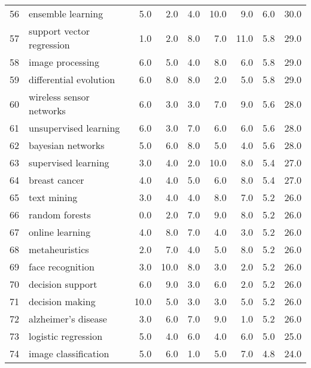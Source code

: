 \begin{tabular}{llrrrrrrr}
56 &                ensemble learning &   5.0 &   2.0 &    4.0 &   10.0 &    9.0 &    6.0 &   30.0 \\
57 &        support vector regression &   1.0 &   2.0 &    8.0 &    7.0 &   11.0 &    5.8 &   29.0 \\
58 &                 image processing &   6.0 &   5.0 &    4.0 &    8.0 &    6.0 &    5.8 &   29.0 \\
59 &           differential evolution &   6.0 &   8.0 &    8.0 &    2.0 &    5.0 &    5.8 &   29.0 \\
60 &         wireless sensor networks &   6.0 &   3.0 &    3.0 &    7.0 &    9.0 &    5.6 &   28.0 \\
61 &            unsupervised learning &   6.0 &   3.0 &    7.0 &    6.0 &    6.0 &    5.6 &   28.0 \\
62 &                bayesian networks &   5.0 &   6.0 &    8.0 &    5.0 &    4.0 &    5.6 &   28.0 \\
63 &              supervised learning &   3.0 &   4.0 &    2.0 &   10.0 &    8.0 &    5.4 &   27.0 \\
64 &                    breast cancer &   4.0 &   4.0 &    5.0 &    6.0 &    8.0 &    5.4 &   27.0 \\
65 &                      text mining &   3.0 &   4.0 &    4.0 &    8.0 &    7.0 &    5.2 &   26.0 \\
66 &                   random forests &   0.0 &   2.0 &    7.0 &    9.0 &    8.0 &    5.2 &   26.0 \\
67 &                  online learning &   4.0 &   8.0 &    7.0 &    4.0 &    3.0 &    5.2 &   26.0 \\
68 &                   metaheuristics &   2.0 &   7.0 &    4.0 &    5.0 &    8.0 &    5.2 &   26.0 \\
69 &                 face recognition &   3.0 &  10.0 &    8.0 &    3.0 &    2.0 &    5.2 &   26.0 \\
70 &                 decision support &   6.0 &   9.0 &    3.0 &    6.0 &    2.0 &    5.2 &   26.0 \\
71 &                  decision making &  10.0 &   5.0 &    3.0 &    3.0 &    5.0 &    5.2 &   26.0 \\
72 &              alzheimer's disease &   3.0 &   6.0 &    7.0 &    9.0 &    1.0 &    5.2 &   26.0 \\
73 &              logistic regression &   5.0 &   4.0 &    6.0 &    4.0 &    6.0 &    5.0 &   25.0 \\
74 &             image classification &   5.0 &   6.0 &    1.0 &    5.0 &    7.0 &    4.8 &   24.0 \\

\end{tabular}
